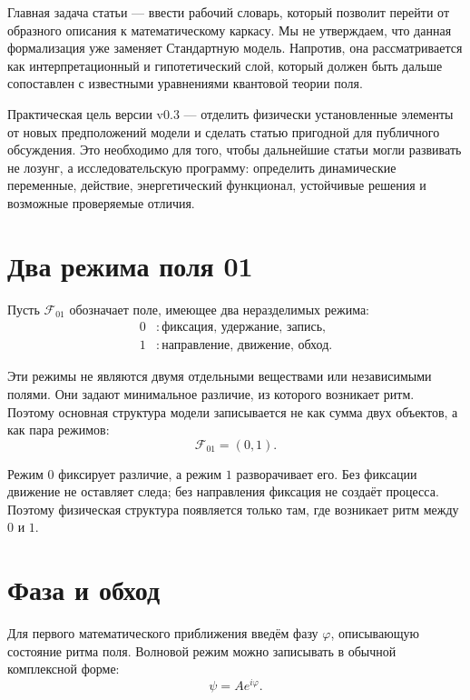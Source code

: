 \documentclass[11pt,a4paper]{article}
\newcommand{\field}{\mathcal{F}_{01}}
\newcommand{\phase}{\varphi}
\begin{document}
Главная задача статьи --- ввести рабочий словарь, который позволит перейти от образного описания к математическому каркасу. Мы не утверждаем, что данная формализация уже заменяет Стандартную модель. Напротив, она рассматривается как интерпретационный и гипотетический слой, который должен быть дальше сопоставлен с известными уравнениями квантовой теории поля.

Практическая цель версии v0.3 --- отделить физически установленные элементы от новых предположений модели и сделать статью пригодной для публичного обсуждения. Это необходимо для того, чтобы дальнейшие статьи могли развивать не лозунг, а исследовательскую программу: определить динамические переменные, действие, энергетический функционал, устойчивые решения и возможные проверяемые отличия.

\section{Два режима поля 01}

Пусть $\field$ обозначает поле, имеющее два неразделимых режима:
\begin{align}
0 &: \text{фиксация, удержание, запись}, \\
1 &: \text{направление, движение, обход}.
\end{align}

Эти режимы не являются двумя отдельными веществами или независимыми полями. Они задают минимальное различие, из которого возникает ритм. Поэтому основная структура модели записывается не как сумма двух объектов, а как пара режимов:
\begin{equation}
\field = (0,1).
\end{equation}

Режим $0$ фиксирует различие, а режим $1$ разворачивает его. Без фиксации движение не оставляет следа; без направления фиксация не создаёт процесса. Поэтому физическая структура появляется только там, где возникает ритм между $0$ и $1$.

\section{Фаза и обход}

Для первого математического приближения введём фазу $\phase$, описывающую состояние ритма поля. Волновой режим можно записывать в обычной комплексной форме:
\begin{equation}
\psi = A e^{i\phase}.
\end{equation}
\end{document}
